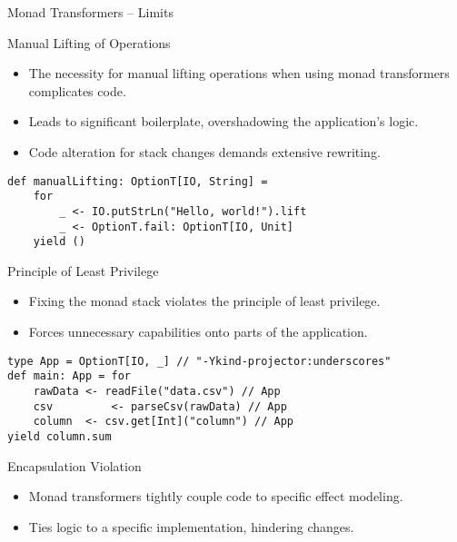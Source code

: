 \documentclass[presentation, 10pt]{beamer}\mode<presentation>{\usetheme{AMSBolognaFC}}
\begin{document}
\begin{frame}[fragile,shrink=35]{Monad Transformers -- Limits}
\begin{exampleblock}{Manual Lifting of Operations}
	\begin{itemize}
		\item The necessity for manual lifting operations when using monad transformers complicates code.
  \item Leads to significant boilerplate, overshadowing the application's logic.
  \item Code alteration for stack changes demands extensive rewriting.
	\end{itemize}
\begin{tcolorbox}
\begin{verbatim}
def manualLifting: OptionT[IO, String] =
	for
		_ <- IO.putStrLn("Hello, world!").lift
		_ <- OptionT.fail: OptionT[IO, Unit]
	yield ()
\end{verbatim}
\end{tcolorbox}
\end{exampleblock}
\begin{exampleblock}{Principle of Least Privilege}
	\begin{itemize}
		\item Fixing the monad stack violates the principle of least privilege.
		\item Forces unnecessary capabilities onto parts of the application.
	\end{itemize}
\begin{tcolorbox}
\begin{verbatim}
type App = OptionT[IO, _] // "-Ykind-projector:underscores"
def main: App = for
	rawData <- readFile("data.csv") // App
	csv 		<- parseCsv(rawData) // App
	column  <- csv.get[Int]("column") // App
yield column.sum
\end{verbatim}
\end{tcolorbox}
\end{exampleblock}
\begin{exampleblock}{Encapsulation Violation}
\begin{itemize}
	\item Monad transformers tightly couple code to specific effect modeling.
	\item Ties logic to a specific implementation, hindering changes.
\end{itemize}
\end{exampleblock}
\end{frame}
\end{document}
